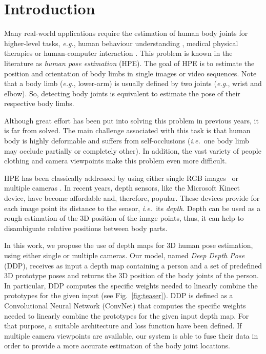 \documentclass[review,12pt,3p]{elsarticle}
\def \eg{\textit{e.g.}}
\def \ie{\textit{i.e.}}
\begin{document}
\section{Introduction} \label{sec:intro}
Many real-world applications require the estimation of human body joints for higher-level tasks, \eg, human behaviour understanding \citep{Ferrari09,zhu2014eccv}, medical physical therapies \citep{obdrvzalek2012real,achilles2016miccai} or human-computer interaction \citep{huo2009amigas,Shotton2013pami}. This problem is known in the literature as \textit{human pose estimation} (HPE). The goal of HPE is to estimate the position and orientation of body limbs in single images or video sequences. Note that a body limb (\eg, lower-arm) is usually defined by two joints (\eg, wrist and elbow). So, detecting body joints is equivalent to estimate the pose of their respective body limbs.

Although great effort has been put into solving this problem in previous years, it is far from solved. The main challenge associated with this task is that human body is highly deformable and suffers from self-occlusions (\ie~one body limb may occlude partially or completely other). In addition, the vast variety of people clothing and camera viewpoints make this problem even more difficult.

HPE has been classically addressed by using either single RGB images~\citep{Agarwal06,Eichner2012ijcv,Cherian14,rogez2017lcr} or multiple cameras \citep{Shen2011,LopezQuintero2017}.
In recent years, depth sensors, like the Microsoft Kinect device, have become affordable and, therefore, popular. These devices provide for each image point its distance to the sensor, \ie~its \textit{depth}. Depth can be used as a rough estimation of the 3D position of the image points, thus, it can help to disambiguate relative positions between body parts. 

In this work, we propose the use of depth maps for 3D human pose estimation, using either single or multiple cameras. 
Our model, named \textit{Deep Depth Pose} (DDP), receives as input a depth map containing a person 
and a set of predefined 3D prototype poses and returns the 3D position of the body joints of the person. In particular, DDP computes the specific weights needed to linearly combine the prototypes for the given input (see Fig.~\ref{fig:teaser}). 
DDP is defined as a Convolutional Neural Network (ConvNet) \citep{Le1998} that computes the specific weights needed to linearly combine the prototypes for the given input depth map. For that purpose, a suitable architecture and loss function have been defined.
If multiple camera viewpoints are available, our system is able to fuse their data in order to provide a more accurate estimation of the body joint locations.
\end{document}
